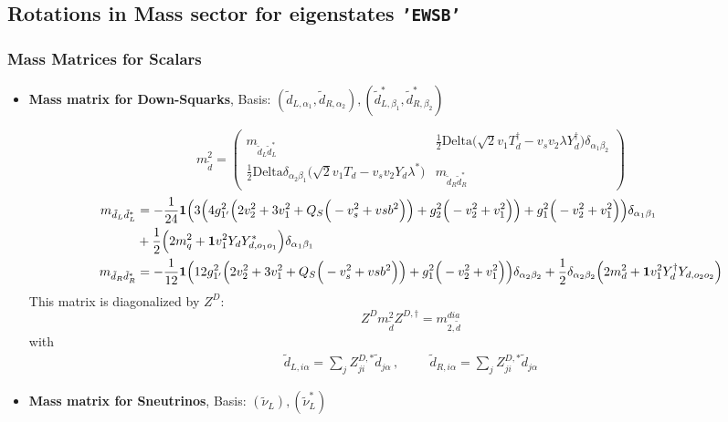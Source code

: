 \subsection{Rotations in Mass sector for eigenstates {\tt 'EWSB'} } 
\subsubsection{Mass Matrices for Scalars}
\begin{itemize} 
\item {\bf Mass matrix for Down-Squarks}, Basis: \( \left(\tilde{d}_{L,{{\alpha_1}}}, \tilde{d}_{R,{{\alpha_2}}}\right), \left(\tilde{d}^*_{L,{{\beta_1}}}, \tilde{d}^*_{R,{{\beta_2}}}\right) \) 
 
\begin{equation} 
m^2_{\tilde{d}} = \left( 
\begin{array}{cc}
m_{\tilde{d}_L\tilde{d}_L^*} &\frac{1}{2} \text{Delta} \Big(\sqrt{2} v_1 T_{d}^{\dagger}  - v_s v_2 \lambda Y_{d}^{\dagger} \Big)\delta_{{\alpha_1} {\beta_2}} \\ 
\frac{1}{2} \text{Delta} \delta_{{\alpha_2} {\beta_1}} \Big(\sqrt{2} v_1 T_d  - v_s v_2 Y_d \lambda^* \Big) &m_{\tilde{d}_R\tilde{d}_R^*}\end{array} 
\right) 
 \end{equation} 
\begin{align} 
m_{\tilde{d}_L\tilde{d}_L^*} &= -\frac{1}{24} {\bf 1} \Big(3 \Big(4 g_{1'}^{2} \Big(2 v_{2}^{2}  + 3 v_{1}^{2}  + Q_{S} \Big(- v_{s}^{2}  + vsb^{2}\Big)\Big) + g_{2}^{2} \Big(- v_{2}^{2}  + v_{1}^{2}\Big)\Big) + g_{1}^{2} \Big(- v_{2}^{2}  + v_{1}^{2}\Big)\Big)\delta_{{\alpha_1} {\beta_1}} \nonumber \\ 
 &+\frac{1}{2} \Big(2 m_q^2  + {\bf 1} v_{1}^{2} Y_d Y^*_{d,{{o_1} {o_1}}} \Big)\delta_{{\alpha_1} {\beta_1}} \\ 
m_{\tilde{d}_R\tilde{d}_R^*} &= -\frac{1}{12} {\bf 1} \Big(12 g_{1'}^{2} \Big(2 v_{2}^{2}  + 3 v_{1}^{2}  + Q_{S} \Big(- v_{s}^{2}  + vsb^{2}\Big)\Big) + g_{1}^{2} \Big(- v_{2}^{2}  + v_{1}^{2}\Big)\Big)\delta_{{\alpha_2} {\beta_2}}  + \frac{1}{2} \delta_{{\alpha_2} {\beta_2}} \Big(2 m_d^2  + {\bf 1} v_{1}^{2} Y_{d}^{\dagger} Y_{d,{{o_2} {o_2}}} \Big)
\end{align} 
This matrix is diagonalized by \(Z^D\): 
\begin{equation} 
Z^D m^2_{\tilde{d}} Z^{D,\dagger} = m^{dia}_{2,\tilde{d}} 
\end{equation} 
with 
\begin{align} 
\tilde{d}_{L,{i \alpha}} = \sum_{j}Z^{D,*}_{j i}\tilde{d}_{{j \alpha}}\,, \hspace{1cm} 
\tilde{d}_{R,{i \alpha}} = \sum_{j}Z^{D,*}_{j i}\tilde{d}_{{j \alpha}}
\end{align} 
\item {\bf Mass matrix for Sneutrinos}, Basis: \( \left(\tilde{\nu}_L\right), \left(\tilde{\nu}_L^*\right) \) 
 

\end{itemize}
